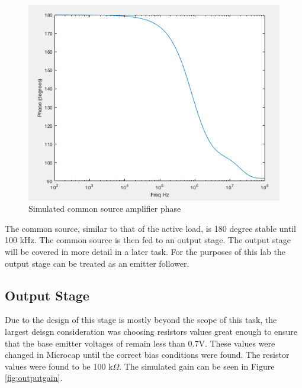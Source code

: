 \begin{figure}[H]
	\begin{center}
		\includegraphics[scale=.40]{Simulations/phasecommonsource.png}
		\caption{Simulated common source amplifier phase}
		\label{fig:csphase}
	\end{center}
\end{figure} 

The common source, similar to that of the active load, is 180 degree stable until 100 kHz.  The common source is then fed to an output stage. The output stage will be covered in more detail in a later task. For the purposes of this lab the output stage can be treated as an emitter follower.

\subsection{Output Stage}

Due to the design of this stage is mostly beyond the scope of this task, the largest deisgn consideration was choosing resistors values great enough to ensure that the base emitter voltages of remain less than 0.7V. These values were changed in Microcap until the correct bias conditions were found. The resistor values were found to be 100 k$\Omega$. The simulated gain can be seen in Figure \ref{fig:outputgain}.

